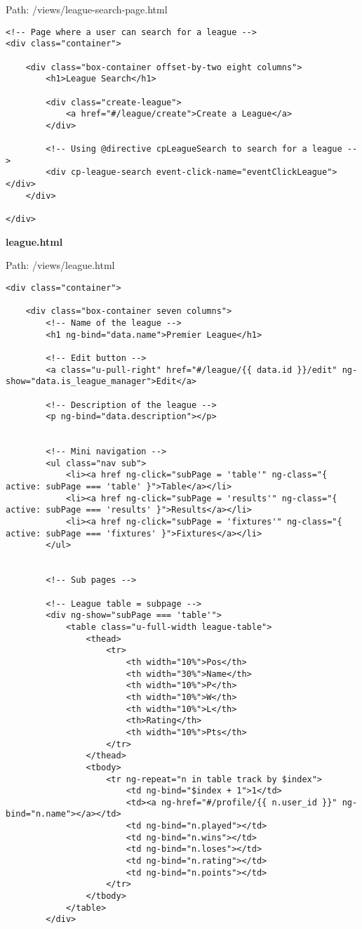 Path: /views/league-search-page.html
{\scriptsize
\begin{lstlisting}
<!-- Page where a user can search for a league -->
<div class="container">

	<div class="box-container offset-by-two eight columns">
		<h1>League Search</h1>

		<div class="create-league">
			<a href="#/league/create">Create a League</a>
		</div>

		<!-- Using @directive cpLeagueSearch to search for a league -->
		<div cp-league-search event-click-name="eventClickLeague"></div>
	</div>

</div>\end{lstlisting}
}
\textbf{league.html}\label{league.html}

Path: /views/league.html
{\scriptsize
\begin{lstlisting}
<div class="container">

	<div class="box-container seven columns">
		<!-- Name of the league -->
		<h1 ng-bind="data.name">Premier League</h1>

		<!-- Edit button -->
		<a class="u-pull-right" href="#/league/{{ data.id }}/edit" ng-show="data.is_league_manager">Edit</a>

		<!-- Description of the league -->
		<p ng-bind="data.description"></p>


		<!-- Mini navigation -->
		<ul class="nav sub">
			<li><a href ng-click="subPage = 'table'" ng-class="{ active: subPage === 'table' }">Table</a></li>
			<li><a href ng-click="subPage = 'results'" ng-class="{ active: subPage === 'results' }">Results</a></li>
			<li><a href ng-click="subPage = 'fixtures'" ng-class="{ active: subPage === 'fixtures' }">Fixtures</a></li>
		</ul>


		<!-- Sub pages -->

		<!-- League table = subpage -->
		<div ng-show="subPage === 'table'">
			<table class="u-full-width league-table">
				<thead>
					<tr>
						<th width="10%">Pos</th>
						<th width="30%">Name</th>
						<th width="10%">P</th>
						<th width="10%">W</th>
						<th width="10%">L</th>
						<th>Rating</th>
						<th width="10%">Pts</th>
					</tr>
				</thead>
				<tbody>
					<tr ng-repeat="n in table track by $index">
						<td ng-bind="$index + 1">1</td>
						<td><a ng-href="#/profile/{{ n.user_id }}" ng-bind="n.name"></a></td>
						<td ng-bind="n.played"></td>
						<td ng-bind="n.wins"></td>
						<td ng-bind="n.loses"></td>
						<td ng-bind="n.rating"></td>
						<td ng-bind="n.points"></td>
					</tr>
				</tbody>
			</table>
		</div>



\end{lstlisting}}
